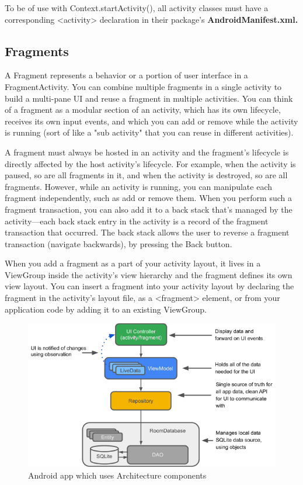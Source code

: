 To be of use with Context.startActivity(), all activity classes must have a corresponding <activity> declaration in their package's \textbf{AndroidManifest.xml.}

\subsection{Fragments}
A Fragment represents a behavior or a portion of user interface in a FragmentActivity. You can combine multiple fragments in a single activity to build a multi-pane UI and reuse a fragment in multiple activities. You can think of a fragment as a modular section of an activity, which has its own lifecycle, receives its own input events, and which you can add or remove while the activity is running (sort of like a "sub activity" that you can reuse in different activities).\cite{android_activity_fragments}\newline

A fragment must always be hosted in an activity and the fragment's lifecycle is directly affected by the host activity's lifecycle. For example, when the activity is paused, so are all fragments in it, and when the activity is destroyed, so are all fragments. However, while an activity is running, you can manipulate each fragment independently, such as add or remove them. When you perform such a fragment transaction, you can also add it to a back stack that's managed by the activity—each back stack entry in the activity is a record of the fragment transaction that occurred. The back stack allows the user to reverse a fragment transaction (navigate backwards), by pressing the Back button.\cite{android_activity_fragments}\newline

When you add a fragment as a part of your activity layout, it lives in a ViewGroup inside the activity's view hierarchy and the fragment defines its own view layout. You can insert a fragment into your activity layout by declaring the fragment in the activity's layout file, as a <fragment> element, or from your application code by adding it to an existing ViewGroup.\cite{android_activity_fragments}\newline

\newpage
\begin{figure}[h!]
	\caption{Android app which uses Architecture components \cite{android_guide_arc}}
	\label{image:myImageName}
	\centering
	\includegraphics[width=1\textwidth]{Images/android_app_arc.png}
\end{figure}	

